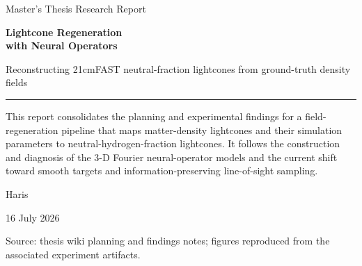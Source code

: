 \documentclass[11pt,a4paper]{article}
\begin{document}
\begin{titlepage}
  \centering
  \vspace*{20mm}
  {\sffamily\color{navy}\Large Master's Thesis Research Report\par}
  \vspace{8mm}
  {\Huge\bfseries Lightcone Regeneration\\[2mm]
  with Neural Operators\par}
  \vspace{7mm}
  {\Large Reconstructing 21cmFAST neutral-fraction lightcones from ground-truth density fields\par}
  \vspace{18mm}
  \rule{0.82\textwidth}{0.8pt}
  \vspace{12mm}

  \begin{minipage}{0.82\textwidth}
  \large
  This report consolidates the planning and experimental findings for a
  field-regeneration pipeline that maps matter-density lightcones and their
  simulation parameters to neutral-hydrogen-fraction lightcones. It follows
  the construction and diagnosis of the 3-D Fourier neural-operator models
  and the current shift toward smooth targets and information-preserving
  line-of-sight sampling.
  \end{minipage}

  \vfill
  {\Large Haris\par}
  \vspace{3mm}
  {\large 16 July 2026\par}
  \vspace{12mm}
  {\small Source: thesis wiki planning and findings notes; figures reproduced
  from the associated experiment artifacts.\par}
\end{titlepage}

\tableofcontents
\clearpage
\listoffigures
\clearpage
{}
\end{document}
